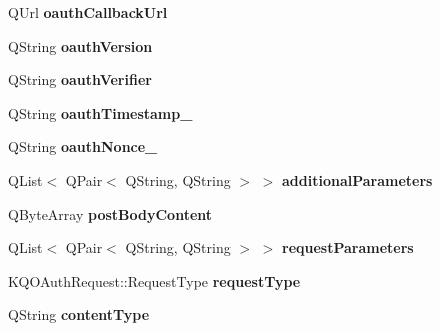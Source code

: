\begin{DoxyCompactItemize}
\item 
\mbox{\label{class_k_q_o_auth_request_private_a15572665d5b1bc74502d34f66ad1d15a}} 
Q\+Url {\bfseries oauth\+Callback\+Url}
\item 
\mbox{\label{class_k_q_o_auth_request_private_aa5d23eecbf26f2fea6b825dc93bbe58b}} 
Q\+String {\bfseries oauth\+Version}
\item 
\mbox{\label{class_k_q_o_auth_request_private_a13bb2740160dd13a94bf27e31e35688d}} 
Q\+String {\bfseries oauth\+Verifier}
\item 
\mbox{\label{class_k_q_o_auth_request_private_a674041cc2125f6b42bdb98a682927be7}} 
Q\+String {\bfseries oauth\+Timestamp\+\_\+}
\item 
\mbox{\label{class_k_q_o_auth_request_private_a15e8147e6a4cd5fb59d2fef5c9301cc0}} 
Q\+String {\bfseries oauth\+Nonce\+\_\+}
\item 
\mbox{\label{class_k_q_o_auth_request_private_af67203cb8731cc30a825ef5469166fd9}} 
Q\+List$<$ Q\+Pair$<$ Q\+String, Q\+String $>$ $>$ {\bfseries additional\+Parameters}
\item 
\mbox{\label{class_k_q_o_auth_request_private_a073ae38fc3461618842efe1db17502fd}} 
Q\+Byte\+Array {\bfseries post\+Body\+Content}
\item 
\mbox{\label{class_k_q_o_auth_request_private_af7de05a715f25408d9729c510f9932c3}} 
Q\+List$<$ Q\+Pair$<$ Q\+String, Q\+String $>$ $>$ {\bfseries request\+Parameters}
\item 
\mbox{\label{class_k_q_o_auth_request_private_a0389b94e077e5f6ba18eca89252a7b74}} 
K\+Q\+O\+Auth\+Request\+::\+Request\+Type {\bfseries request\+Type}
\item 
\mbox{\label{class_k_q_o_auth_request_private_af16726d86655459004d158e71404a8e3}} 
Q\+String {\bfseries content\+Type}

\end{DoxyCompactItemize}
